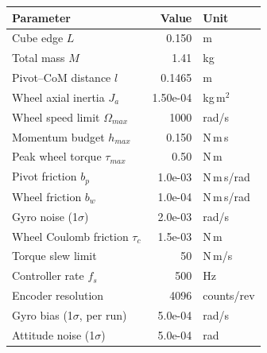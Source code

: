 \begin{tabular}{lrl}
\toprule
Parameter & Value & Unit \\
\midrule
Cube edge $L$ & 0.150 & m \\
Total mass $M$ & 1.41 & kg \\
Pivot--CoM distance $l$ & 0.1465 & m \\
Wheel axial inertia $J_a$ & 1.50e-04 & kg\,m$^2$ \\
Wheel speed limit $\Omega_{max}$ & 1000 & rad/s \\
Momentum budget $h_{max}$ & 0.150 & N\,m\,s \\
Peak wheel torque $\tau_{max}$ & 0.50 & N\,m \\
Pivot friction $b_p$ & 1.0e-03 & N\,m\,s/rad \\
Wheel friction $b_w$ & 1.0e-04 & N\,m\,s/rad \\
Gyro noise (1$\sigma$) & 2.0e-03 & rad/s \\
Wheel Coulomb friction $\tau_c$ & 1.5e-03 & N\,m \\
Torque slew limit & 50 & N\,m/s \\
Controller rate $f_s$ & 500 & Hz \\
Encoder resolution & 4096 & counts/rev \\
Gyro bias (1$\sigma$, per run) & 5.0e-04 & rad/s \\
Attitude noise (1$\sigma$) & 5.0e-04 & rad \\
\bottomrule
\end{tabular}
